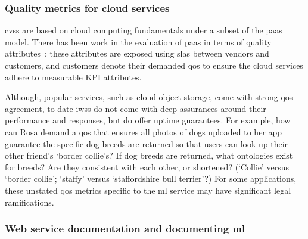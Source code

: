 \subsubsection{Quality metrics for cloud services}
 
\glspl{cvs} are based on cloud computing fundamentals under a subset of the \gls{paas} model.  There has been work in the evaluation of \gls{paas} in terms of quality attributes~\citep{Garg:2011gw}: these attributes are exposed using \glspl{sla} between vendors and customers, and customers denote their demanded \gls{qos} to ensure the cloud services adhere to measurable KPI attributes. 

Although, popular services, such as cloud object storage, come with strong \gls{qos} agreement, to date \glspl{iws} do not come with deep assurances around their performance and responses, but do offer uptime guarantees. For example, how can Rosa demand a \gls{qos} that ensures all photos of dogs uploaded to her app guarantee the specific dog breeds are returned so that users can look up their other friend's `border collie's? If dog breeds are returned, what ontologies exist for breeds? Are they consistent with each other, or shortened? (`Collie' versus `border collie'; `staffy' versus `staffordshire bull terrier'?) For some applications, these unstated \gls{qos} metrics specific to the \gls{ml} service may have significant legal ramifications.

\subsubsection[Web service documentation and documenting ML]{Web service documentation and documenting \gls{ml}}

